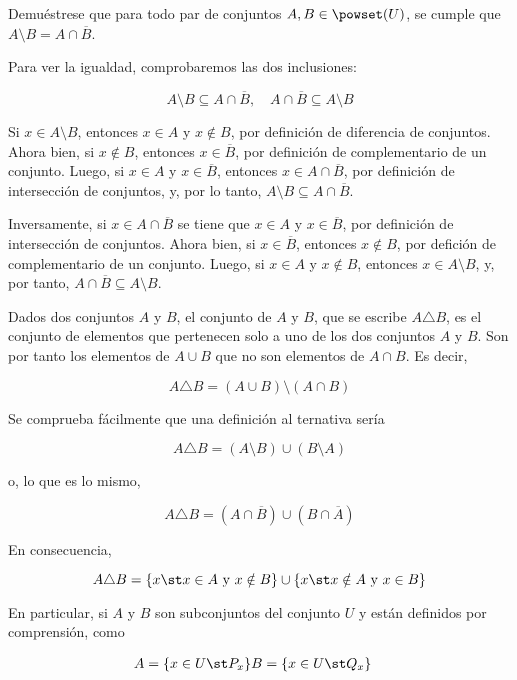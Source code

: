 \begin{exercise}
  Demuéstrese que para todo par de conjuntos $A, B \in \powset(U)$, se
  cumple que $A \setminus B = A \cap \overline{B}$.

  Para ver la igualdad, comprobaremos las dos inclusiones:

  \[ A \setminus B \subseteq A \cap \overline{B}, \quad A \cap \overline{B}
  \subseteq A \setminus B \]

  Si $x \in A \setminus B$, entonces $x \in A$ y $x \notin B$, por
  definición de diferencia de conjuntos. Ahora bien, si $x \notin B$,
  entonces $x \in \overline{B}$, por definición de complementario de un
  conjunto. Luego, si $x \in A$ y $x \in \overline{B}$, entonces $x \in A
  \cap \overline{B}$, por definición de intersección de conjuntos, y, por lo
  tanto, $A \setminus B \subseteq A \cap \overline{B}$.

  Inversamente, si $x \in A \cap \overline{B}$  se tiene que $x \in A$ y $x
  \in \overline{B}$, por definición de intersección de conjuntos. Ahora
  bien, si $x \in \overline{B}$, entonces $x \notin B$, por defición de
  complementario de un conjunto. Luego, si $x \in A$ y $x \notin B$,
  entonces $x \in A \setminus B$, y, por tanto, $A \cap \overline{B}
  \subseteq A \setminus B$.
\end{exercise}

Dados dos conjuntos $A$ y $B$, el conjunto  de
$A$ y $B$, que se escribe $A \triangle B$, es el conjunto de elementos que
pertenecen solo a uno de los dos conjuntos $A$ y $B$. Son por tanto los
elementos de $A \cup B$ que no son elementos de $A \cap B$. Es decir,

\[ A \triangle B = (A \cup B) \setminus (A \cap B) \]

Se comprueba fácilmente que una definición al ternativa sería

\[ A \triangle B = (A \setminus B) \cup (B \setminus A) \]

\noindent o, lo que es lo mismo,

\[ A \triangle B = (A \cap \overline{B}) \cup (B \cap \overline{A}) \]

\noindent En consecuencia,

\[ A \triangle B = \{x \st x \in A \ \text{y} \ x \notin B\} \cup \{x \st x
\notin A \ \text{y} \ x \in B\} \]

En particular, si $A$ y $B$ son subconjuntos del conjunto $U$ y están
definidos por comprensión, como

\begin{align*}
  A = \{x \in U \st P_x\}
    & B = \{x \in U \st Q_x\}
\end{align*}

